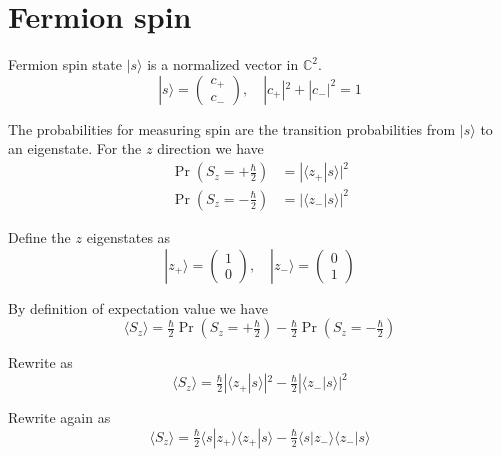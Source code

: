 


\section*{Fermion spin}

Fermion spin state $|s\rangle$ is a normalized vector in $\mathbb C^2$.
\begin{equation*}
|s\rangle=\begin{pmatrix}c_+\\c_-\end{pmatrix},\quad|c_+|^2+|c_-|^2=1
\end{equation*}

The probabilities for measuring spin are the transition probabilities from $|s\rangle$ to an eigenstate.
For the $z$ direction we have
\begin{align*}
\Pr\left(S_z=+\tfrac{\hbar}{2}\right)&=|\langle z_+|s\rangle|^2
\\
\Pr\left(S_z=-\tfrac{\hbar}{2}\right)&=|\langle z_-|s\rangle|^2
\end{align*}

Define the $z$ eigenstates as
\begin{equation*}
|z_+\rangle=\begin{pmatrix}1\\0\end{pmatrix},\quad
|z_-\rangle=\begin{pmatrix}0\\1\end{pmatrix}
\end{equation*}

By definition of expectation value we have
\begin{equation*}
\langle S_z\rangle
=\tfrac{\hbar}{2}\Pr\left(S_z=+\tfrac{\hbar}{2}\right)
-\tfrac{\hbar}{2}\Pr\left(S_z=-\tfrac{\hbar}{2}\right)
\end{equation*}

Rewrite as
\begin{equation*}
\langle S_z\rangle=\tfrac{\hbar}{2}|\langle z_+|s\rangle|^2-\tfrac{\hbar}{2}|\langle z_-|s\rangle|^2
\end{equation*}

Rewrite again as
\begin{equation*}
\langle S_z\rangle
=\tfrac{\hbar}{2}\langle s|z_+\rangle\langle z_+|s\rangle
-\tfrac{\hbar}{2}\langle s|z_-\rangle\langle z_-|s\rangle
\end{equation*}

